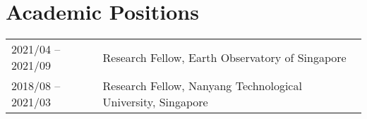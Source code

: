 \section*{Academic Positions}
\begin{tabular}{p{} p{}}
2021/04 -- 2021/09 & Research Fellow, Earth Observatory of Singapore \\
2018/08 -- 2021/03 & Research Fellow, Nanyang Technological University, Singapore \\
\end{tabular}
